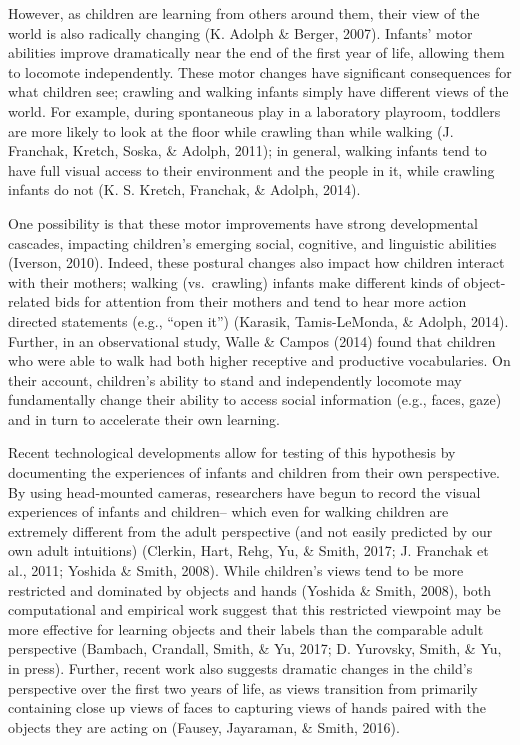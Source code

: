 \documentclass[10pt, letterpaper]{article}
\begin{document}
However, as children are learning from others around them, their view of
the world is also radically changing (K. Adolph \& Berger, 2007).
Infants' motor abilities improve dramatically near the end of the first
year of life, allowing them to locomote independently. These motor
changes have significant consequences for what children see; crawling
and walking infants simply have different views of the world. For
example, during spontaneous play in a laboratory playroom, toddlers are
more likely to look at the floor while crawling than while walking (J.
Franchak, Kretch, Soska, \& Adolph, 2011); in general, walking infants
tend to have full visual access to their environment and the people in
it, while crawling infants do not (K. S. Kretch, Franchak, \& Adolph,
2014).

One possibility is that these motor improvements have strong
developmental cascades, impacting children's emerging social, cognitive,
and linguistic abilities (Iverson, 2010). Indeed, these postural changes
also impact how children interact with their mothers; walking
(vs.~crawling) infants make different kinds of object-related bids for
attention from their mothers and tend to hear more action directed
statements (e.g., ``open it'') (Karasik, Tamis-LeMonda, \& Adolph,
2014). Further, in an observational study, Walle \& Campos (2014) found
that children who were able to walk had both higher receptive and
productive vocabularies. On their account, children's ability to stand
and independently locomote may fundamentally change their ability to
access social information (e.g., faces, gaze) and in turn to accelerate
their own learning.

Recent technological developments allow for testing of this hypothesis
by documenting the experiences of infants and children from their own
perspective. By using head-mounted cameras, researchers have begun to
record the visual experiences of infants and children-- which even for
walking children are extremely different from the adult perspective (and
not easily predicted by our own adult intuitions) (Clerkin, Hart, Rehg,
Yu, \& Smith, 2017; J. Franchak et al., 2011; Yoshida \& Smith, 2008).
While children's views tend to be more restricted and dominated by
objects and hands (Yoshida \& Smith, 2008), both computational and
empirical work suggest that this restricted viewpoint may be more
effective for learning objects and their labels than the comparable
adult perspective (Bambach, Crandall, Smith, \& Yu, 2017; D. Yurovsky,
Smith, \& Yu, in press). Further, recent work also suggests dramatic
changes in the child's perspective over the first two years of life, as
views transition from primarily containing close up views of faces to
capturing views of hands paired with the objects they are acting on
(Fausey, Jayaraman, \& Smith, 2016).
\end{document}
